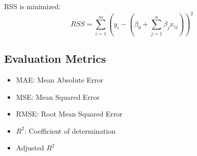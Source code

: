 \documentclass[12pt]{article}
\begin{document}
RSS is minimized:
\[
RSS = \sum_{i=1}^m \left( y_i - \left( \beta_0 + \sum_{j=1}^n \beta_j x_{ij} \right) \right)^2
\]

\subsection*{Evaluation Metrics}
\begin{itemize}
  \item MAE: Mean Absolute Error
  \item MSE: Mean Squared Error
  \item RMSE: Root Mean Squared Error
  \item $R^2$: Coefficient of determination
  \item Adjusted $R^2$
\end{itemize}
\end{document}
